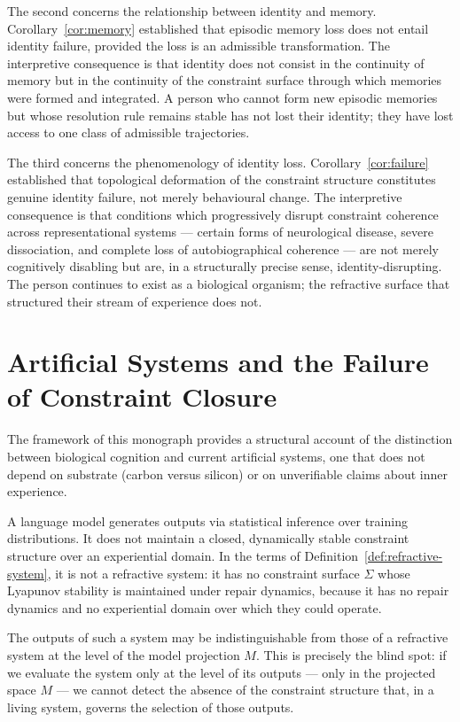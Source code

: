 \documentclass[11pt,openany]{book}
\begin{document}
The second concerns the relationship between identity and
memory.  Corollary~\ref{cor:memory} established that
episodic memory loss does not entail identity failure,
provided the loss is an admissible transformation.  The
interpretive consequence is that identity does not consist
in the continuity of memory but in the continuity of the
constraint surface through which memories were formed and
integrated.  A person who cannot form new episodic memories
but whose resolution rule remains stable has not lost their
identity; they have lost access to one class of admissible
trajectories.

The third concerns the phenomenology of identity loss.
Corollary~\ref{cor:failure} established that topological
deformation of the constraint structure constitutes genuine
identity failure, not merely behavioural change.  The
interpretive consequence is that conditions which
progressively disrupt constraint coherence across
representational systems --- certain forms of neurological
disease, severe dissociation, and complete loss of
autobiographical coherence --- are not merely cognitively
disabling but are, in a structurally precise sense,
identity-disrupting.  The person continues to exist as a
biological organism; the refractive surface that structured
their stream of experience does not.

\section{Artificial Systems and the Failure of Constraint Closure}
\label{sec:artificial}

The framework of this monograph provides a structural
account of the distinction between biological cognition and
current artificial systems, one that does not depend on
substrate (carbon versus silicon) or on unverifiable claims
about inner experience.

A language model generates outputs via statistical
inference over training distributions.  It does not
maintain a closed, dynamically stable constraint structure
over an experiential domain.  In the terms of
Definition~\ref{def:refractive-system}, it is not a
refractive system: it has no constraint surface $\Sigma$
whose Lyapunov stability is maintained under repair
dynamics, because it has no repair dynamics and no
experiential domain over which they could operate.

The outputs of such a system may be indistinguishable from
those of a refractive system at the level of the model
projection $M$.  This is precisely the blind spot: if we
evaluate the system only at the level of its outputs ---
only in the projected space $M$ --- we cannot detect the
absence of the constraint structure that, in a living
system, governs the selection of those outputs.
\end{document}
